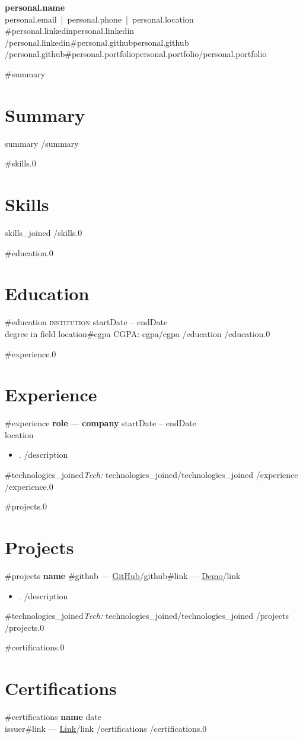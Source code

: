 \documentclass[11pt,a4paper]{article}
\begin{document}
\begin{flushleft}
    {\LARGE\bfseries {{personal.name}}}\\[4pt]
    {{personal.email}} \,|\, {{personal.phone}} \,|\, {{personal.location}}\\
    {{#personal.linkedin}}{{personal.linkedin}} \, {{/personal.linkedin}}{{#personal.github}}{{personal.github}} \, {{/personal.github}}{{#personal.portfolio}}{{personal.portfolio}}{{/personal.portfolio}}
\end{flushleft}

{{#summary}}
\section{Summary}
 {{summary}}
{{/summary}}

{{#skills.0}}
\section{Skills}
{{skills_joined}}
{{/skills.0}}

{{#education.0}}
\section{Education}
 {{#education}}
\textsc{ {{institution}} } \hfill {{startDate}} -- {{endDate}}\\
{{degree}} in {{field}} \hfill {{location}}{{#cgpa}} \hfill CGPA: {{cgpa}}{{/cgpa}}
 {{/education}}
{{/education.0}}

{{#experience.0}}
\section{Experience}
 {{#experience}}
\textbf{ {{role}} } --- \textbf{ {{company}} } \hfill {{startDate}} -- {{endDate}}\\
 {{location}}
\begin{itemize}[leftmargin=*,nosep]
 {{#description}}
    \item {{.}}
 {{/description}}
\end{itemize}
 {{#technologies_joined}}\textit{Tech:} {{technologies_joined}}{{/technologies_joined}}
 {{/experience}}
{{/experience.0}}

{{#projects.0}}
\section{Projects}
 {{#projects}}
\textbf{ {{name}} }{{#github}} --- \href{ {{github}} }{GitHub}{{/github}}{{#link}} --- \href{ {{link}} }{Demo}{{/link}}\\
\begin{itemize}[leftmargin=*,nosep]
 {{#description}}
    \item {{.}}
 {{/description}}
\end{itemize}
 {{#technologies_joined}}\textit{Tech:} {{technologies_joined}}{{/technologies_joined}}
 {{/projects}}
{{/projects.0}}

{{#certifications.0}}
\section{Certifications}
 {{#certifications}}
\textbf{ {{name}} } \hfill {{date}}\\
 {{issuer}}{{#link}} --- \href{ {{link}} }{Link}{{/link}}
 {{/certifications}}
{{/certifications.0}}
\end{document}
